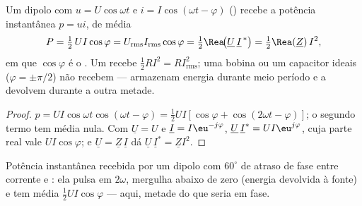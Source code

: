 \begin{theorem}\label{thm:b1:sinusoidal-impedance:power}
Um dipolo com $u = U\cos\omega t$ e $i = I\cos(\omega t - \varphi)$
() recebe a potência instantânea $p = ui$, de
média
\[
P = \tfrac12\,UI\cos\varphi = U_{\mathrm{rms}}I_{\mathrm{rms}}\cos\varphi
= \tfrac12\Rea\!\big(\underline U\,\underline I^{\,*}\big) = \tfrac12\Rea(\underline Z)\,I^2,
\]
em que $\cos\varphi$ é o \emph{}. Um  recebe
$\tfrac12 RI^2 = RI_{\mathrm{rms}}^2$; uma bobina ou um capacitor ideais
($\varphi = \pm\pi/2$) não recebem  --- armazenam energia
durante meio período e a devolvem durante a outra metade.
\end{theorem}

\begin{proof}
$p = UI\cos\omega t\cos(\omega t - \varphi) = \tfrac12 UI[\cos\varphi +
\cos(2\omega t - \varphi)]$; o segundo termo tem média nula. Com
$\underline U = U$ e $\underline I = I\eu^{-j\varphi}$,
$\underline U\,\underline I^* = UI\eu^{j\varphi}$, cuja parte real vale
$UI\cos\varphi$; e $\underline U = \underline Z\,\underline I$ dá
$\underline U\,\underline I^* = \underline Z I^2$.
\end{proof}

\begin{omfigure}

{\small Potência instantânea recebida por um dipolo com $60^\circ$ de
atraso de fase entre corrente e : ela pulsa em $2\omega$, mergulha abaixo de zero
(energia devolvida à fonte) e tem média $\tfrac12 UI\cos\varphi$
--- aqui, metade do que seria em fase.}
\end{omfigure}

